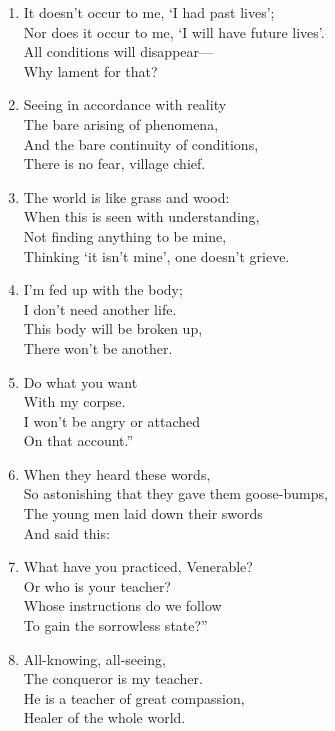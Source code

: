 \documentclass[10pt, openany]{book}
\newcommand*{\vleftofline}[1]{\leavevmode\llap{#1}}
\begin{document}
\begin{enumerate}
\item It doesn’t occur to me, ‘I had past lives’;\\
Nor does it occur to me, ‘I will have future lives’.\\
All conditions will disappear—\\
Why lament for that?

\item Seeing in accordance with reality\\
The bare arising of phenomena,\\
And the bare continuity of conditions,\\
There is no fear, village chief.

\item The world is like grass and wood:\\
When this is seen with understanding,\\
Not finding anything to be mine,\\
Thinking ‘it isn’t mine’, one doesn’t grieve.

\item I’m fed up with the body;\\
I don’t need another life.\\
This body will be broken up,\\
There won’t be another.

\item Do what you want\\
With my corpse.\\
I won’t be angry or attached\\
On that account.”

\item When they heard these words,\\
So astonishing that they gave them goose-bumps,\\
The young men laid down their swords\\
And said this:

\item \vleftofline{“}What have you practiced, Venerable?\\
Or who is your teacher?\\
Whose instructions do we follow\\
To gain the sorrowless state?”

\item \vleftofline{“}All-knowing, all-seeing,\\
The conqueror is my teacher.\\
He is a teacher of great compassion,\\
Healer of the whole world.


\end{enumerate}
\end{document}
